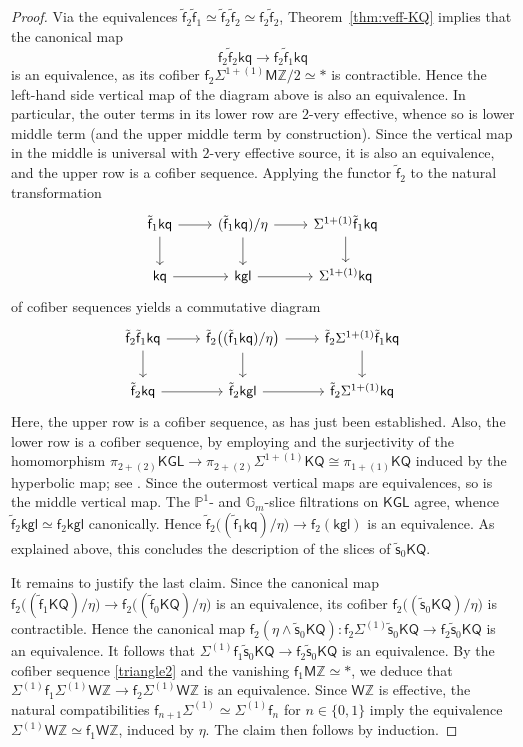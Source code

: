 \documentclass[11pt,hyp,english]{article}
\newcommand{\Z}{\mathbb{Z}}
\renewcommand{\P}{\mathbb{P}}
\newcommand{\Gm}{\mathbb{G}_m}
\newcommand{\KGL}{\mathsf{KGL}}
\newcommand{\kgl}{\mathsf{kgl}}
\newcommand{\KQ}{\mathsf{KQ}}
\newcommand{\kq}{\mathsf{kq}}
\newcommand{\MZ}{\mathsf{M}\Z}
\newcommand{\HWZ}{\mathsf{W}\Z}
\newcommand{\vs}{\tilde{\mathsf{s}}}
\newcommand{\f}{\mathsf{f}}
\newcommand{\vf}{\tilde{{\mathsf{f}}}}
\let\iso=\cong
\let\smash=\wedge
\theoremstyle{definition}
\begin{document}
\begin{proof}
Via the equivalences $\vf_2\vf_1\simeq \vf_2\vf_2\simeq \f_2\vf_2$, Theorem~\ref{thm:veff-KQ} implies that the canonical map
\[ \f_2\vf_2\kq\to \f_2\vf_1\kq\] 
is an equivalence, as its cofiber $\f_2\Sigma^{1+(1)}\MZ/2 \simeq \ast$ is contractible.
Hence the left-hand side vertical map of the diagram above is also an equivalence. 
In particular, the outer terms in its lower row are $2$-very effective, whence so is lower middle term (and the upper middle term by construction).
Since the vertical map in the middle is universal with $2$-very effective source, it is also an equivalence, and the upper row is a cofiber sequence.
Applying the functor $\vf_2$ to the natural transformation 
\[
\begin{tikzcd}
\vf_1\kq\ar[r] \ar[d] & 
(\vf_1\kq)/\eta\ar[r] \ar[d] & 
\Sigma^{1+(1)}\vf_1\kq \ar[d] \\
\kq \ar[r] &
\kgl \ar[r] &
\Sigma^{1+(1)}\kq
\end{tikzcd}
\]      
of cofiber sequences yields a commutative diagram
\[
\begin{tikzcd}
\vf_2\vf_1\kq\ar[r] \ar[d] & 
\vf_2\bigl((\vf_1\kq)/\eta\bigr)\ar[r] \ar[d] & 
\vf_2\Sigma^{1+(1)}\vf_1\kq \ar[d] \\
\vf_2\kq \ar[r] &
\vf_2\kgl \ar[r] &
\vf_2\Sigma^{1+(1)}\kq
\end{tikzcd}
\] 
Here, the upper row is a cofiber sequence, as has just been established.
Also, 
the lower row is a cofiber sequence, 
by employing \cite[Lemma 15]{Bachmann} and the surjectivity of the homomorphism 
$\pi_{2+(2)}\KGL \to \pi_{2+(2)}\Sigma^{1+(1)}\KQ\iso \pi_{1+(1)}\KQ$ 
induced by the hyperbolic map; see .
Since the outermost vertical maps are equivalences, so is the middle vertical map.
The $\P^1$- and $\Gm$-slice filtrations on $\KGL$ agree, whence $\vf_2\kgl \simeq \f_2\kgl$ canonically.
Hence $\vf_2\bigl((\vf_1 \kq)/\eta\bigr)\to \f_2(\kgl)$ is an equivalence.
As explained above, this concludes the description of the slices of $\vs_0\KQ$.

It remains to justify the last claim.
Since the canonical map $\f_2\bigl((\vf_1\KQ)/\eta\bigr)\to \f_2\bigl((\vf_0\KQ)/\eta\bigr)$ is an equivalence, its cofiber $\f_2\bigl((\vs_0\KQ)/\eta\bigr)$ is contractible.
Hence the canonical map $\f_2(\eta\smash \vs_0\KQ)\colon \f_2\Sigma^{(1)}\vs_0\KQ\to  \f_2\vs_0\KQ$ is an equivalence.
It follows that $\Sigma^{(1)}\f_1\vs_0\KQ\to \f_2\vs_0\KQ$ is an equivalence.
By the cofiber sequence \eqref{triangle2} and the vanishing $\f_1\MZ\simeq \ast$, we deduce that $\Sigma^{(1)}\f_1\Sigma^{(1)}\HWZ\to \f_2\Sigma^{(1)}\HWZ$ is an equivalence.
Since $\HWZ$ is effective, the natural compatibilities $\f_{n+1}\Sigma^{(1)}\simeq\Sigma^{(1)}\f_n$ for $n\in \{0,1\}$ imply the equivalence $\Sigma^{(1)}\HWZ\simeq \f_1\HWZ$, induced by $\eta$.
The claim then follows by induction.
\end{proof}
\end{document}
